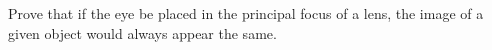 Prove that if the eye be placed in the principal 
focus of a lens, the image of a given object would
always appear the same.
